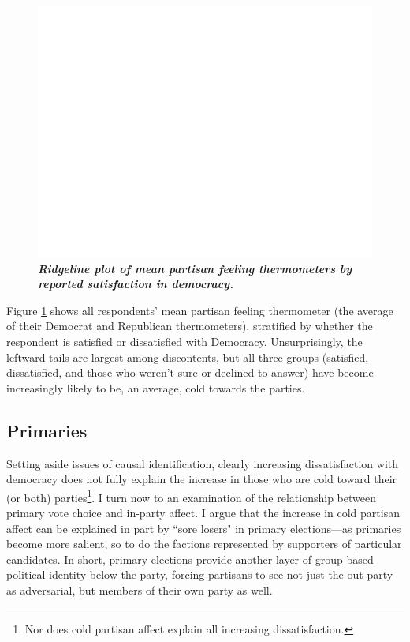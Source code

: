 \documentclass[12pt]{paper}
\begin{document}
\begin{figure}
\centering
\includegraphics[width=.7\textwidth]{cdf-ridge-all-dis.png}
\caption{\label{fig:ridge-dis} \textit{\textbf{Ridgeline plot of mean partisan feeling thermometers by reported satisfaction in democracy.} %
}}
\end{figure}

Figure \ref{fig:ridge-dis} shows all respondents' mean partisan feeling thermometer (the average of their Democrat and Republican thermometers), stratified by whether the respondent is satisfied or dissatisfied with Democracy. Unsurprisingly, the leftward tails are largest among discontents, but all three groups (satisfied, dissatisfied, and those who weren't sure or declined to answer) have become increasingly likely to be, an average, cold towards the parties.

\subsection{Primaries}
Setting aside issues of causal identification, clearly increasing dissatisfaction with democracy does not fully explain  the increase in those who are cold toward their (or both) parties\footnote{Nor does cold partisan affect explain all increasing dissatisfaction.}. I turn now to an examination of the relationship between primary vote choice and in-party affect. I argue that the increase in cold partisan affect can be explained in part by ``sore losers" in primary elections---as primaries become more salient, so to do the factions represented by supporters of particular candidates. In short, primary elections provide another layer of group-based political identity below the party, forcing partisans to see not just the out-party as adversarial, but members of their own party as well.
\end{document}
